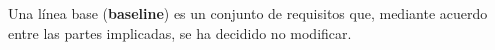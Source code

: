 Una línea base (\textbf{baseline}) es un conjunto de requisitos que, mediante acuerdo entre las partes
implicadas, se ha decidido no modificar.

